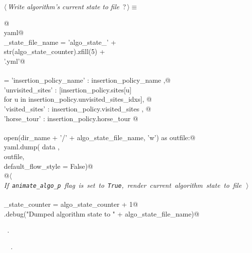 \documentclass[11.5pt]{report}
\begin{document}
\begin{flushleft} \small\label{scrap26}\raggedright\small
{} $\langle\,${\itshape Write algorithm's current state to file}\nobreak\ {\footnotesize {?}}$\,\rangle\equiv$
\vspace{-1ex}
\begin{list}{}{} \item
\mbox{}\verb@   @\\
\mbox{}\verb@import yaml@\\
\mbox{}\verb@algo_state_file_name = 'algo_state_'                    + \@\\
\mbox{}\verb@                       str(algo_state_counter).zfill(5) + \@\\
\mbox{}\verb@                       '.yml'@\\
\mbox{}\verb@@\\
\mbox{}\verb@data = {'insertion_policy_name' : insertion_policy_name                       ,@\\
\mbox{}\verb@        'unvisited_sites'       : [insertion_policy.sites[u] \@\\
\mbox{}\verb@                                       for u in insertion_policy.unvisited_sites_idxs], @\\
\mbox{}\verb@        'visited_sites'         : insertion_policy.visited_sites                    , @\\
\mbox{}\verb@        'horse_tour'            : insertion_policy.horse_tour }@\\
\mbox{}\verb@@\\
\mbox{}\verb@with open(dir_name + '/' + algo_state_file_name, 'w') as outfile:@\\
\mbox{}\verb@     yaml.dump( data   , \@\\
\mbox{}\verb@                outfile, \@\\
\mbox{}\verb@                default_flow_style = False)@\\
\mbox{}\verb@     @\hbox{$\langle\,${\itshape If \verb|animate_algo_p| flag is set to \verb|True|, render current algorithm state to file}\nobreak\ {\footnotesize {}}$\,\rangle$}\verb@@\\
\mbox{}\verb@@\\
\mbox{}\verb@algo_state_counter = algo_state_counter + 1@\\
\mbox{}\verb@logger.debug("Dumped algorithm state to " + algo_state_file_name)@\\
\mbox{}\verb@@{\NWsep}
\end{list}
\vspace{-1.5ex}
\footnotesize
\begin{list}{}{\setlength{\itemsep}{-\parsep}\setlength{\itemindent}{-\leftmargin}}
\item \NWtxtMacroRefIn\ .
\item \NWtxtIdentsUsed\nobreak\  \verb@logger@\nobreak\ .
\item{}
\end{list}
\vspace{4ex}
\end{flushleft}
\end{document}
